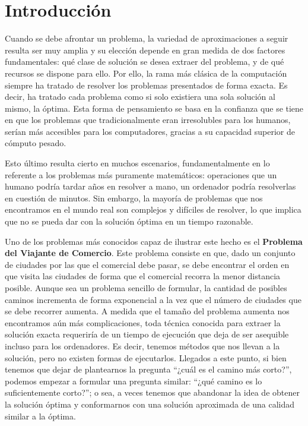 \chapter{Introducción}

Cuando se debe afrontar un problema, la variedad de aproximaciones a seguir resulta ser muy amplia y su elección depende en gran medida de dos factores fundamentales: qué clase de solución se desea extraer del problema, y de qué recursos se dispone para ello. 
Por ello, la rama más clásica de la computación siempre ha tratado de resolver los problemas presentados de forma exacta. 
Es decir, ha tratado cada problema como si solo existiera una sola solución al mismo, la óptima. 
Esta forma de pensamiento se basa en la confianza que se tiene en que los problemas que tradicionalmente eran irresolubles para los humanos, serían más accesibles para los computadores, gracias a su capacidad superior de cómputo pesado.

Esto último resulta cierto en muchos escenarios, fundamentalmente en lo referente a los problemas más puramente matemáticos: operaciones que un humano podría tardar años en resolver a mano, un ordenador podría resolverlas en cuestión de minutos. 
Sin embargo, la mayoría de problemas que nos encontramos en el mundo real son complejos y difíciles de resolver, lo que implica que no se pueda dar con la solución óptima en un tiempo razonable. 

Uno de los problemas más conocidos capaz de ilustrar este hecho es el \textbf{Problema del Viajante de Comercio}. 
Este problema consiste en que, dado un conjunto de ciudades por las que el comercial debe pasar, se debe encontrar el orden en que visita las ciudades de forma que el comercial recorra la menor distancia posible. 
Aunque sea un problema sencillo de formular, la cantidad de posibles caminos incrementa de forma exponencial a la vez que el número de ciudades que se debe recorrer aumenta. 
A medida que el tamaño del problema aumenta nos encontramos aún más complicaciones, toda técnica conocida para extraer la solución exacta requeriría de un tiempo de ejecución que deja de ser asequible incluso para los ordenadores. 
Es decir, tenemos métodos que nos llevan a la solución, pero no existen formas de ejecutarlos. 
Llegados a este punto, si bien tenemos que dejar de plantearnos la pregunta ``¿cuál es el camino más corto?'', podemos empezar a formular una pregunta similar: ``¿qué camino es lo suficientemente corto?''; o sea, a veces tenemos que abandonar la idea de obtener la solución óptima y conformarnos con una solución aproximada de una calidad similar a la óptima.

